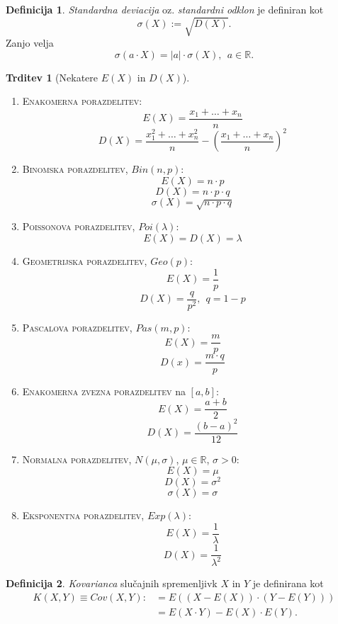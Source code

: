 \documentclass[11pt]{article}
\theoremstyle{definition}
\newtheorem{definicija}{Definicija}[section]
\theoremstyle{definition}
\newtheorem{trditev}{Trditev}[section]
\theoremstyle{definition}
\begin{document}
\begin{definicija}

\textit{Standardna deviacija} oz. \textit{standardni odklon} je definiran kot
$$\sigma(X) := \sqrt{D(X)}.$$
Zanjo velja
$$\sigma(a \cdot X) = |a| \cdot \sigma(X), ~~a \in \mathbb{R}.$$

\end{definicija}
\vspace{0.5cm}

\begin{trditev}[Nekatere $E(X)$ in $D(X)$]
~
\begin{enumerate}
	\item \textsc{Enakomerna porazdelitev}:
	$$E(X) = \frac{x_1 + \ldots + x_n}{n}$$
	$$D(X) = \frac{x_1^2 + \ldots + x_n^2}{n} - \left( \frac{x_1 + \ldots + x_n}{n} \right)^2$$
	\item \textsc{Binomska porazdelitev}, $Bin(n, p)$:
	$$E(X) = n \cdot p$$
	$$D(X) = n \cdot p \cdot q$$
	$$\sigma(X) = \sqrt{n \cdot p \cdot q}$$
	\item \textsc{Poissonova porazdelitev}, $Poi(\lambda)$:
	$$E(X) = D(X) = \lambda$$
	\item \textsc{Geometrijska porazdelitev}, $Geo(p)$:
	$$E(X) = \frac{1}{p}$$
	$$D(X) = \frac{q}{p^2}, ~~q = 1 - p$$
	\item \textsc{Pascalova porazdelitev}, $Pas(m, p)$:
	$$E(X) = \frac{m}{p}$$
	$$D(x) = \frac{m \cdot q}{p}$$
	\item \textsc{Enakomerna zvezna porazdelitev} na $[a, b]$:
	$$E(X) = \frac{a + b}{2}$$ $$
	D(X) = \frac{(b-a)^2}{12}$$
	\item \textsc{Normalna porazdelitev}, $N(\mu, \sigma)$, $\mu \in \mathbb{R}$, $\sigma > 0$:
	$$E(X) = \mu$$
	$$D(X) = \sigma^2$$
	$$\sigma(X) = \sigma$$
	\item \textsc{Eksponentna porazdelitev}, $Exp(\lambda)$:
	$$E(X) = \frac{1}{\lambda}$$
	$$D(X) = \frac{1}{\lambda^2}$$
\end{enumerate}

\end{trditev}
\vspace{0.5cm}

\begin{definicija}

\textit{Kovarianca} slučajnih spremenljivk $X$ in $Y$ je definirana kot 
\begin{align*}
K(X, Y) \equiv Cov(X, Y) :&= E((X - E(X)) \cdot (Y - E(Y))) \\
&= E(X \cdot Y) - E(X) \cdot E(Y).
\end{align*}


\end{definicija}
\vspace{0.5cm}
\end{document}
